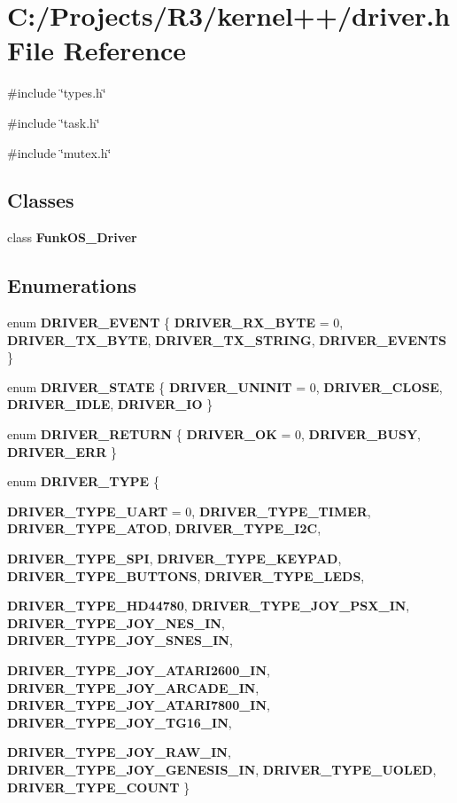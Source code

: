 \section{C:/Projects/R3/kernel++/driver.h File Reference}
\label{driver_8h}
{\ttfamily \#include \char`\"{}types.h\char`\"{}}\par
{\ttfamily \#include \char`\"{}task.h\char`\"{}}\par
{\ttfamily \#include \char`\"{}mutex.h\char`\"{}}\par
\subsection*{Classes}
\begin{DoxyCompactItemize}
\item 
class {\bf FunkOS\_\-Driver}
\end{DoxyCompactItemize}
\subsection*{Enumerations}
\begin{DoxyCompactItemize}
\item 
enum {\bf DRIVER\_\-EVENT} \{ {\bf DRIVER\_\-RX\_\-BYTE} =  0, 
{\bf DRIVER\_\-TX\_\-BYTE}, 
{\bf DRIVER\_\-TX\_\-STRING}, 
{\bf DRIVER\_\-EVENTS}
 \}
\item 
enum {\bf DRIVER\_\-STATE} \{ {\bf DRIVER\_\-UNINIT} =  0, 
{\bf DRIVER\_\-CLOSE}, 
{\bf DRIVER\_\-IDLE}, 
{\bf DRIVER\_\-IO}
 \}
\item 
enum {\bf DRIVER\_\-RETURN} \{ {\bf DRIVER\_\-OK} =  0, 
{\bf DRIVER\_\-BUSY}, 
{\bf DRIVER\_\-ERR}
 \}
\item 
enum {\bf DRIVER\_\-TYPE} \{ \par
{\bf DRIVER\_\-TYPE\_\-UART} =  0, 
{\bf DRIVER\_\-TYPE\_\-TIMER}, 
{\bf DRIVER\_\-TYPE\_\-ATOD}, 
{\bf DRIVER\_\-TYPE\_\-I2C}, 
\par
{\bf DRIVER\_\-TYPE\_\-SPI}, 
{\bf DRIVER\_\-TYPE\_\-KEYPAD}, 
{\bf DRIVER\_\-TYPE\_\-BUTTONS}, 
{\bf DRIVER\_\-TYPE\_\-LEDS}, 
\par
{\bf DRIVER\_\-TYPE\_\-HD44780}, 
{\bf DRIVER\_\-TYPE\_\-JOY\_\-PSX\_\-IN}, 
{\bf DRIVER\_\-TYPE\_\-JOY\_\-NES\_\-IN}, 
{\bf DRIVER\_\-TYPE\_\-JOY\_\-SNES\_\-IN}, 
\par
{\bf DRIVER\_\-TYPE\_\-JOY\_\-ATARI2600\_\-IN}, 
{\bf DRIVER\_\-TYPE\_\-JOY\_\-ARCADE\_\-IN}, 
{\bf DRIVER\_\-TYPE\_\-JOY\_\-ATARI7800\_\-IN}, 
{\bf DRIVER\_\-TYPE\_\-JOY\_\-TG16\_\-IN}, 
\par
{\bf DRIVER\_\-TYPE\_\-JOY\_\-RAW\_\-IN}, 
{\bf DRIVER\_\-TYPE\_\-JOY\_\-GENESIS\_\-IN}, 
{\bf DRIVER\_\-TYPE\_\-UOLED}, 
{\bf DRIVER\_\-TYPE\_\-COUNT}
 \}
\end{DoxyCompactItemize}


